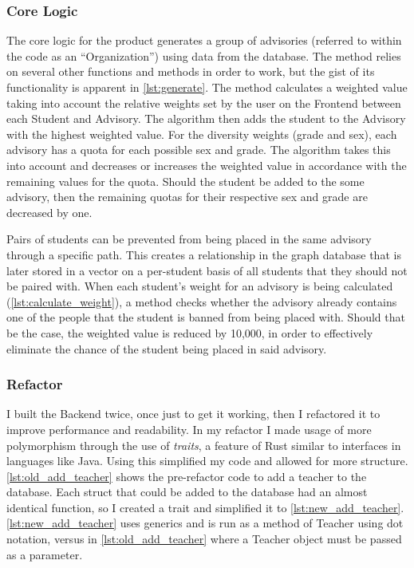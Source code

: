 \documentclass[advisory-ia.tex]{subfiles}
\begin{document}
  \subsubsection{Core Logic}
  The core logic for the product generates a group of advisories (referred to within the code as an \enquote{Organization}) using data from the database.
  The method relies on several other functions and methods in order to work, but the gist of its functionality is apparent in \cref{lst:generate}.
  The method calculates a weighted value taking into account the relative weights set by the user on the Frontend between each Student and Advisory.
  The algorithm then adds the student to the Advisory with the highest weighted value.
  For the diversity weights (grade and sex), each advisory has a quota for each possible sex and grade.
  The algorithm takes this into account and decreases or increases the weighted value in accordance with the remaining values for the quota.
  Should the student be added to the some advisory, then the remaining quotas for their respective sex and grade are decreased by one.

  Pairs of students can be prevented from being placed in the same advisory through a specific path.
  This creates a relationship in the graph database that is later stored in a vector on a per-student basis of all students that they should not be paired with.
  When each student's weight for an advisory is being calculated (\cref{lst:calculate_weight}), a method checks whether the advisory already contains one of the people that the student is banned from being placed with.
  Should that be the case, the weighted value is reduced by 10,000, in order to effectively eliminate the chance of the student being placed in said advisory.

  

  

  \subsubsection{Refactor}
  I built the Backend twice, once just to get it working, then I refactored it to improve performance and readability.
  In my refactor I made usage of more polymorphism through the use of \emph{traits}, a feature of Rust similar to interfaces in languages like Java.
  Using this simplified my code and allowed for more structure.
  \cref{lst:old_add_teacher} shows the pre-refactor code to add a teacher to the database.
  Each struct that could be added to the database had an almost identical function, so I created a trait and simplified it to \cref{lst:new_add_teacher}.
  \cref{lst:new_add_teacher} uses generics and is run as a method of Teacher using dot notation, versus in \cref{lst:old_add_teacher} where a Teacher object must be passed as a parameter.
\end{document}
